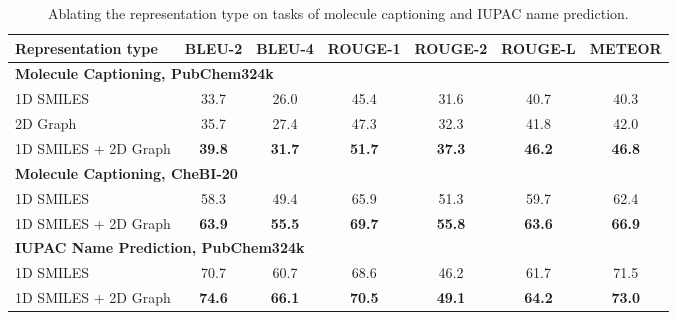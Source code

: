 \documentclass[11pt]{article}
\begin{document}
\begin{table*}[t]
\centering
\small
\begin{subtable}[t]{\textwidth}
\centering
\small
\begin{tabular}{lcccccc} \toprule
Representation type      & BLEU-2            & BLEU-4           & ROUGE-1              & ROUGE-2              & ROUGE-L              & METEOR               \\ \midrule
\multicolumn{3}{l}{\textbf{Molecule   Captioning, PubChem324k}} & \multicolumn{1}{l}{} & \multicolumn{1}{l}{} & \multicolumn{1}{l}{} & \multicolumn{1}{l}{} \\
1D SMILES                & 33.7              & 26.0             & 45.4                 & 31.6                 & 40.7                 & 40.3                 \\
2D Graph                 & 35.7              & 27.4             & 47.3                 & 32.3                 & 41.8                 & 42.0                 \\
1D SMILES + 2D Graph     & \textbf{39.8}     & \textbf{31.7}    & \textbf{51.7}        & \textbf{37.3}        & \textbf{46.2}        & \textbf{46.8}        \\ \midrule
\multicolumn{3}{l}{\textbf{Molecule   Captioning, CheBI-20}}    & \multicolumn{1}{l}{} & \multicolumn{1}{l}{} & \multicolumn{1}{l}{} & \multicolumn{1}{l}{} \\
1D SMILES                & 58.3              & 49.4             & 65.9                 & 51.3                 & 59.7                 & 62.4                 \\
1D SMILES + 2D Graph     & \textbf{63.9}     & \textbf{55.5}    & \textbf{69.7}        & \textbf{55.8}        & \textbf{63.6}        & \textbf{66.9}        \\ \midrule
\multicolumn{4}{l}{\textbf{IUPAC   Name Prediction, PubChem324k}}                      & \multicolumn{1}{l}{} & \multicolumn{1}{l}{} & \multicolumn{1}{l}{} \\
1D SMILES                & 70.7              & 60.7             & 68.6                 & 46.2                 & 61.7                 & 71.5                 \\
1D SMILES + 2D Graph     & \textbf{74.6}     & \textbf{66.1}    & \textbf{70.5}        & \textbf{49.1}        & \textbf{64.2}        & \textbf{73.0}   \\ \bottomrule
\end{tabular}
\caption{Ablating the representation type on tasks of molecule captioning and IUPAC name prediction. }

\end{subtable}
\end{table*}
\end{document}
